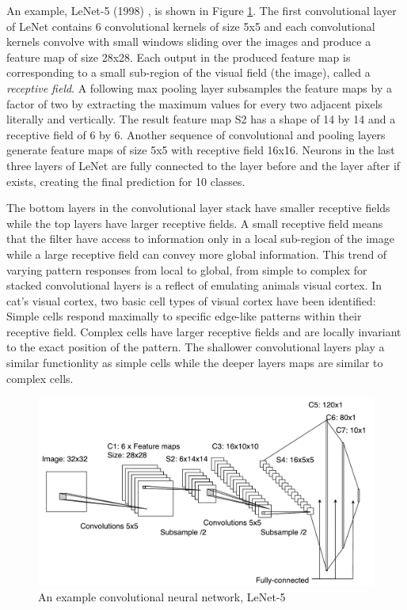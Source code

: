 An example, LeNet-5 (1998) \cite{lecun1998gradient}, is shown in Figure \ref{fig:lenet}.
The first convolutional layer of LeNet contains 6 convolutional kernels of size 5x5 and each convolutional kernels convolve with small windows sliding over the images and produce a feature map of size 28x28.
Each output in the produced feature map is corresponding to a small sub-region of the visual field (the image), called a \textit{receptive field}.
A following max pooling layer subsamples the feature maps by a factor of two by extracting the maximum values for every two adjacent pixels literally and vertically.
The result feature map S2 has a shape of 14 by 14 and a receptive field of 6 by 6.
Another sequence of convolutional and pooling layers generate feature maps of size 5x5 with receptive field 16x16.
Neurons in the last three layers of LeNet are fully connected to the layer before and the layer after if exists, creating the final prediction for 10 classes.

The bottom layers in the convolutional layer stack have smaller receptive fields while the top layers have larger receptive fields.
A small receptive field means that the filter have access to information only in a local sub-region of the image while a large receptive field can convey more global information.
This trend of varying pattern responses from local to global, from simple to complex for stacked convolutional layers is a reflect of emulating animals visual cortex.
In cat's visual cortex\cite{hubel1962receptive}, two basic cell types of visual cortex have been identified:
Simple cells respond maximally to specific edge-like patterns within their receptive field.
Complex cells have larger receptive fields and are locally invariant to the exact position of the pattern.
The shallower convolutional layers play a similar functionlity as simple cells while the deeper layers maps are similar to complex cells.

\begin{figure}[t]
\centering
   \includegraphics[width=\linewidth]{img/lenet}
\caption{An example convolutional neural network, LeNet-5\cite{lecun1998gradient}}
\label{fig:lenet}
\end{figure}

